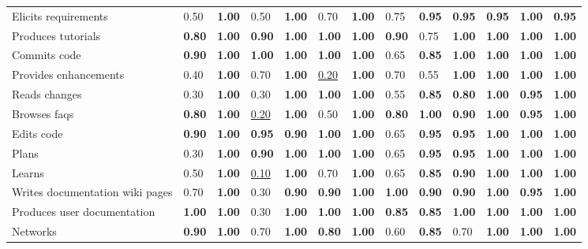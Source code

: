 \begin{tabular}{lllllllllllll}
Elicits requirements & 0.50 & \textbf{1.00} & 0.50 & \textbf{1.00} & 0.70 & \textbf{1.00} & 0.75 & \textbf{0.95} & \textbf{0.95} & \textbf{0.95} & \textbf{1.00} & \textbf{0.95} \\
Produces tutorials & \textbf{0.80} & \textbf{1.00} & \textbf{0.90} & \textbf{1.00} & \textbf{1.00} & \textbf{1.00} & \textbf{0.90} & 0.75 & \textbf{1.00} & \textbf{1.00} & \textbf{1.00} & \textbf{1.00} \\
Commits code & \textbf{0.90} & \textbf{1.00} & \textbf{1.00} & \textbf{1.00} & \textbf{1.00} & \textbf{1.00} & 0.65 & \textbf{0.85} & \textbf{1.00} & \textbf{1.00} & \textbf{1.00} & \textbf{1.00} \\
Provides enhancements & 0.40 & \textbf{1.00} & 0.70 & \textbf{1.00} & \underline{0.20} & \textbf{1.00} & 0.70 & 0.55 & \textbf{1.00} & \textbf{1.00} & \textbf{1.00} & \textbf{1.00} \\
Reads changes & 0.30 & \textbf{1.00} & 0.30 & \textbf{1.00} & \textbf{1.00} & \textbf{1.00} & 0.55 & \textbf{0.85} & \textbf{0.80} & \textbf{1.00} & \textbf{0.95} & \textbf{1.00} \\
Browses faqs & \textbf{0.80} & \textbf{1.00} & \underline{0.20} & \textbf{1.00} & 0.50 & \textbf{1.00} & \textbf{0.80} & \textbf{1.00} & \textbf{0.90} & \textbf{1.00} & \textbf{0.95} & \textbf{1.00} \\
Edits code & \textbf{0.90} & \textbf{1.00} & \textbf{0.95} & \textbf{0.90} & \textbf{1.00} & \textbf{1.00} & 0.65 & \textbf{0.95} & \textbf{0.95} & \textbf{1.00} & \textbf{1.00} & \textbf{1.00} \\
Plans & 0.30 & \textbf{1.00} & \textbf{0.90} & \textbf{1.00} & \textbf{1.00} & \textbf{1.00} & 0.65 & \textbf{0.95} & \textbf{0.95} & \textbf{1.00} & \textbf{1.00} & \textbf{1.00} \\
Learns & 0.50 & \textbf{1.00} & \underline{0.10} & \textbf{1.00} & 0.70 & \textbf{1.00} & 0.65 & \textbf{0.85} & \textbf{0.90} & \textbf{1.00} & \textbf{1.00} & \textbf{1.00} \\
Writes documentation wiki pages & 0.70 & \textbf{1.00} & 0.30 & \textbf{0.90} & \textbf{0.90} & \textbf{1.00} & \textbf{1.00} & \textbf{0.90} & \textbf{0.90} & \textbf{1.00} & \textbf{0.95} & \textbf{1.00} \\
Produces user documentation & \textbf{1.00} & \textbf{1.00} & 0.30 & \textbf{1.00} & \textbf{1.00} & \textbf{1.00} & \textbf{0.85} & \textbf{0.85} & \textbf{1.00} & \textbf{1.00} & \textbf{1.00} & \textbf{1.00} \\
Networks & \textbf{0.90} & \textbf{1.00} & 0.70 & \textbf{1.00} & \textbf{0.80} & \textbf{1.00} & 0.60 & \textbf{0.85} & 0.70 & \textbf{1.00} & \textbf{1.00} & \textbf{1.00} \\

\end{tabular}
